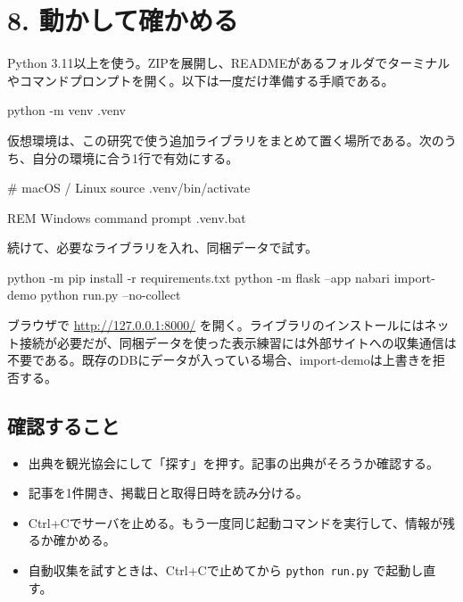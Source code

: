 \documentclass[a4paper,10pt]{ltjsarticle}
\begin{document}
\clearpage

\section*{8. 動かして確かめる}

Python 3.11以上を使う。ZIPを展開し、READMEがあるフォルダでターミナルやコマンドプロンプトを開く。以下は一度だけ準備する手順である。


\begin{Code}
python -m venv .venv
\end{Code}

仮想環境は、この研究で使う追加ライブラリをまとめて置く場所である。次のうち、自分の環境に合う1行で有効にする。


\begin{Code}
# macOS / Linux
source .venv/bin/activate
\end{Code}

\begin{Code}
REM Windows command prompt
.venv\Scripts\activate.bat
\end{Code}

続けて、必要なライブラリを入れ、同梱データで試す。


\begin{Code}
python -m pip install -r requirements.txt
python -m flask --app nabari import-demo
python run.py --no-collect
\end{Code}

ブラウザで \url{http://127.0.0.1:8000/} を開く。ライブラリのインストールにはネット接続が必要だが、同梱データを使った表示練習には外部サイトへの収集通信は不要である。既存のDBにデータが入っている場合、import-demoは上書きを拒否する。


\subsection*{確認すること}

\begin{itemize}

\item 出典を観光協会にして「探す」を押す。記事の出典がそろうか確認する。

\item 記事を1件開き、掲載日と取得日時を読み分ける。

\item Ctrl+Cでサーバを止める。もう一度同じ起動コマンドを実行して、情報が残るか確かめる。

\item 自動収集を試すときは、Ctrl+Cで止めてから \nolinkurl{python run.py} で起動し直す。

\end{itemize}
\end{document}
